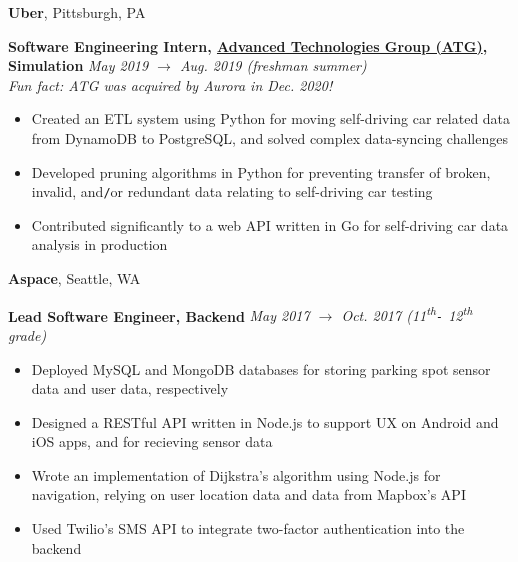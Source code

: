 \documentclass[10pt]{article}
\begin{document}
\begin{flushleft}
		\vspace{-1.50mm}
		\textbf{Uber}, {\small Pittsburgh, PA}\\
		\begin{leftli}
			{\small \textbf{Software Engineering Intern, \href{https://www.uber.com/us/en/atg/research-and-development/perception-and-prediction/}{Advanced Technologies Group (ATG)}, Simulation}} \hfill \textit{\small May 2019 $\rightarrow$ Aug. 2019 (freshman summer)}\\
			{\footnotesize \textit{Fun fact: ATG was acquired by Aurora in Dec. 2020!}}
			\begin{itemize}
				\item Created an ETL system using Python for moving self-driving car related data from DynamoDB to PostgreSQL, and solved complex data-syncing challenges
				\vspace{-2mm}
				\item Developed pruning algorithms in Python for preventing transfer of broken, invalid, and\texttt{/}or redundant data relating to self-driving car testing
				\vspace{-2mm}
				\item Contributed significantly to a web API written in Go for self-driving car data analysis in production
			\end{itemize}
		\end{leftli}

		\vspace{-1.50mm}
		\textbf{Aspace}, {\small Seattle, WA}\\
		\begin{leftli}
			{\small \textbf{Lead Software Engineer, Backend}} \hfill \textit{\small May 2017 $\rightarrow$ Oct. 2017 (11\textsuperscript{th}\texttt{-} 12\textsuperscript{th} grade)}

			\begin{itemize}
				\item Deployed MySQL and MongoDB databases for storing parking spot sensor data and user data, respectively
				\vspace{-2mm}
				\item Designed a RESTful API written in Node.js to support UX on Android and iOS apps, and for recieving sensor data
				\vspace{-2mm}
				\item Wrote an implementation of Dijkstra's algorithm using Node.js for navigation, relying on user location data and data from Mapbox's API
				\vspace{-2mm}
				\item Used Twilio's SMS API to integrate two-factor authentication into the backend
			\end{itemize}
		\end{leftli}


\end{flushleft}
\end{document}
